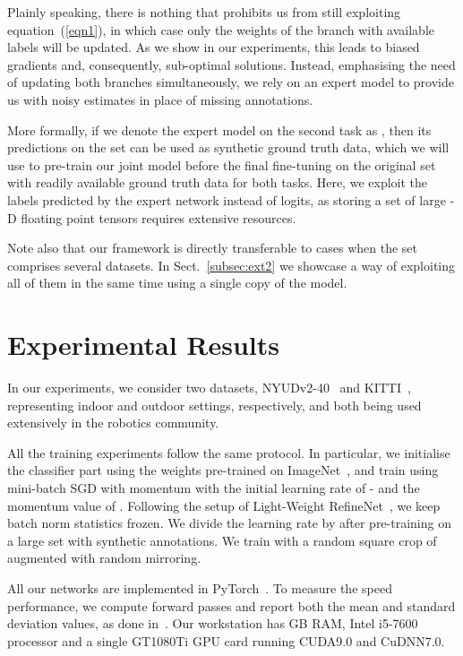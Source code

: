 \documentclass[letterpaper, 10 pt, conference]{ieeeconf}
\begin{document}
Plainly speaking, there is nothing that prohibits us from still exploiting equation~(\ref{eqn1}), in which case only the weights of the branch with available labels will be updated. As we show in our experiments, this leads to biased gradients and, consequently, sub-optimal solutions. Instead, emphasising the need of updating both branches simultaneously, we rely on an expert model to provide us with noisy estimates in place of missing annotations.

More formally, if we denote the expert model on the second task as , then its predictions  on the set  can be used as synthetic ground truth data, which we will use to pre-train our joint model before the final fine-tuning on the original set  with readily available ground truth data for both tasks. Here, we exploit the labels predicted by the expert network instead of logits, as storing a set of large -D floating point tensors requires extensive resources.

Note also that our framework is directly transferable to cases when the set  comprises several datasets. In Sect.~\ref{subsec:ext2} we showcase a way of exploiting all of them in the same time using a single copy of the model.

\section{Experimental Results}
\label{sec:result}

In our experiments, we consider two datasets, NYUDv2-40~\cite{SilbermanHKF12,GuptaAM13} and KITTI~\cite{GeigerLSU13,ros:2015}, representing indoor and outdoor settings, respectively, and both being used extensively in the robotics community.

All the training experiments follow the same protocol. In particular, we initialise the classifier part using the weights pre-trained on ImageNet~\cite{DengDSLL009}, and train using mini-batch SGD with momentum with the initial learning rate of - and the momentum value of . Following the setup of Light-Weight RefineNet~\cite{nekrasovlight}, we keep batch norm statistics frozen. We divide the learning rate by  after pre-training on a large set with synthetic annotations. We train with a random square crop of  augmented with random mirroring.

All our networks are implemented in PyTorch~\cite{paszke2017automatic}. To measure the speed performance, we compute  forward passes and report both the mean and standard deviation values, as done in~\cite{nekrasovlight}. Our workstation has GB RAM, Intel i5-7600 processor and a single GT1080Ti GPU card running CUDA9.0 and CuDNN7.0.
\end{document}
